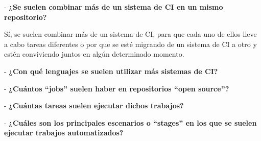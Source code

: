 - \textbf{¿Se suelen combinar más de un sistema de CI en un mismo repositorio?}

Sí, se suelen combinar más de un sistema de CI, para que cada uno de ellos lleve a cabo tareas diferentes o por que se esté migrando de un sistema de CI a otro y estén conviviendo juntos en algún determinado momento.

- \textbf{¿Con qué lenguajes se suelen utilizar más sistemas de CI?}

- \textbf{¿Cuántos ``jobs'' suelen haber en repositorios ``open source''?}

- \textbf{¿Cuántas tareas suelen ejecutar dichos trabajos?}

- \textbf{¿Cuáles son los principales escenarios o ``stages'' en los que se suelen ejecutar trabajos automatizados?}